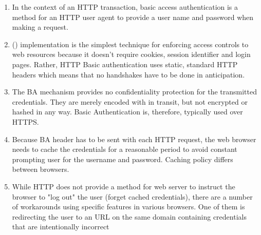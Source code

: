 \begin{enumerate}
\item 
In the context of an HTTP transaction, basic access authentication
is a method for an HTTP user agent to provide a user name and
password when making a request.

\item 
{} () implementation is the simplest
technique for enforcing access controls to web resources because
it doesn't require cookies, session identifier and login pages.
Rather, HTTP Basic authentication uses static, standard HTTP headers
which means that no handshakes have to be done in anticipation.

\item 
The BA mechanism provides no confidentiality protection for the
transmitted credentials. They are merely encoded with  in
transit, but not encrypted or hashed in any way. Basic Authentication
is, therefore, typically used over HTTPS.

\item 
Because BA header has to be sent with each HTTP request, the web
browser needs to cache the credentials for a reasonable period to
avoid constant prompting user for the username and password. Caching
policy differs between browsers. 


\item 
While HTTP does not provide a method for web server to instruct the
browser to "log out" the user (forget cached credentials), there
are a number of workarounds using specific features in various
browsers. One of them is redirecting the user to an URL on the same
domain containing credentials that are intentionally incorrect
\end{enumerate}


